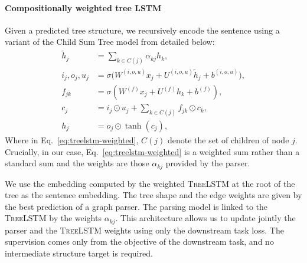 \paragraph{Compositionally weighted tree LSTM} Given a predicted tree structure, we recursively encode the sentence using a variant of the Child Sum Tree model from \textcite{tai_15} detailed below:
\begin{align}
\tilde{h}_j &= \sum_{k \in C(j)} \alpha_{kj} h_k, \label{eq:treelstm-weighted} \\
i_j, o_j, u_j &=\sigma \Big( W^{(i, o, u)} x_j + U^{(i, o, u)} \tilde{h}_j + b^{(i, o, u)} \Big), \\
f_{jk} &= \sigma\left( W^{(f)} x_j + U^{(f)} h_k + b^{(f)} \right), \label{eq:treelstm-f}\\
c_j &= i_j \odot u_j + \sum_{k\in C(j)} f_{jk} \odot c_{k}, \\
h_j &= o_j \odot \tanh(c_j), \label{eq:treelstm-last}
\end{align}
Where in Eq.~\ref{eq:treelstm-weighted}, $C(j)$ denote the set of children of node $j$.
Crucially, in our case, Eq.~\ref{eq:treelstm-weighted} is a weighted sum rather than a standard sum and the weights are those $\alpha_{kj}$ provided by the parser.

We use the embedding computed by the weighted \textsc{TreeLSTM} at the root of the tree as the sentence embedding.
The tree shape and the edge weights are given by the best prediction of a graph parser. The parsing model is linked to the \textsc{TreeLSTM} by the weights $\alpha_{kj}$. This architecture allows us to update jointly the parser and the \textsc{TreeLSTM} weights using only the downstream task loss. The supervision comes only from the objective of the downstream task, and no intermediate structure target is required.

